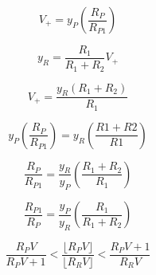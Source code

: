 \begin{equation}
V_{+} = y_P \left( {\frac{R_P}{R_{P1}}} \right)
\end{equation}

\begin{equation}
y_R = \frac{R_1}{R_1 + R_2} V_{+}
\end{equation}

\begin{equation}
V_{+} = \frac{y_R ( R_1 + R_2)}{R_1}
\end{equation}

\begin{equation}
y_P \left( {\frac{R_P}{R_{P1}}} \right) = y_R \left( {\frac{R1 + R2}{R1}} \right)
\end{equation}

\begin{equation}
\frac{R_P}{R_{P1}} = \frac{y_R}{y_P} \left( {\frac{R_1 + R_2}{R_1}} \right)
\end{equation}

\begin{equation}
\frac{R_{P1}}{R_P} = \frac{y_P}{y_R} \left( {\frac{R_1}{R_1 + R_2}} \right)
\end{equation}

\begin{equation}
\frac{R_P V}{R_P V + 1} < \frac{\lfloor R_P V \rfloor}{\lfloor R_R V \rfloor} < \frac{R_P V + 1}{R_R V}
\end{equation}


